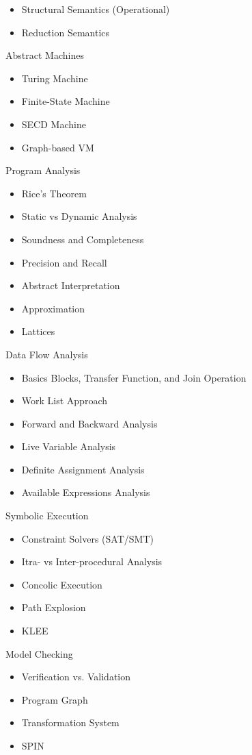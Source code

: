 \documentclass[nobrand,anonymous,nodate,nosecurity]{huawei}
\begin{document}
\begin{lectures}
\begin{itemize}
	\item Structural Semantics (Operational)
	\item Reduction Semantics
	\end{itemize}
\item Abstract Machines
	\begin{itemize}
	\item Turing Machine
	\item Finite-State Machine
	\item SECD Machine
	\item Graph-based VM
	\end{itemize}
\item Program Analysis
	\begin{itemize}
	\item Rice's Theorem
	\item Static vs Dynamic Analysis
	\item Soundness and Completeness
	\item Precision and Recall
	\item Abstract Interpretation
	\item Approximation
	\item Lattices
	\end{itemize}
\item Data Flow Analysis
	\begin{itemize}
	\item Basics Blocks, Transfer Function, and Join Operation
	\item Work List Approach
	\item Forward and Backward Analysis
	\item Live Variable Analysis
	\item Definite Assignment Analysis
	\item Available Expressions Analysis
	\end{itemize}
\item Symbolic Execution
	\begin{itemize}
	\item Constraint Solvers (SAT/SMT)
	\item Itra- vs Inter-procedural Analysis
	\item Concolic Execution
	\item Path Explosion
	\item KLEE
	\end{itemize}
\item Model Checking
	\begin{itemize}
	\item Verification vs. Validation
	\item Program Graph
	\item Transformation System
	\item SPIN
	\end{itemize}
\end{lectures}
\end{document}
